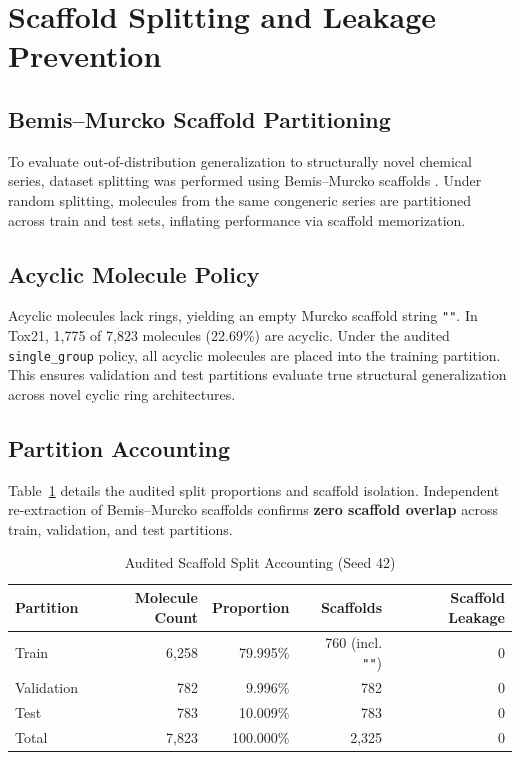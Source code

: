 \documentclass[conference]{IEEEtran}
\begin{document}
\section{Scaffold Splitting and Leakage Prevention}

\subsection{Bemis--Murcko Scaffold Partitioning}
To evaluate out-of-distribution generalization to structurally novel chemical series, dataset splitting was performed using Bemis--Murcko scaffolds \cite{bemis_murcko}.
Under random splitting, molecules from the same congeneric series are partitioned across train and test sets, inflating performance via scaffold memorization.

\subsection{Acyclic Molecule Policy}
Acyclic molecules lack rings, yielding an empty Murcko scaffold string \texttt{""}. In Tox21, 1,775 of 7,823 molecules (22.69\%) are acyclic.
Under the audited \texttt{single\_group} policy, all acyclic molecules are placed into the training partition. This ensures validation and test partitions evaluate true structural generalization across novel cyclic ring architectures.

\subsection{Partition Accounting}
Table~\ref{tab:splits} details the audited split proportions and scaffold isolation. Independent re-extraction of Bemis--Murcko scaffolds confirms \textbf{zero scaffold overlap} across train, validation, and test partitions.

\begin{table}[htbp]
\caption{Audited Scaffold Split Accounting (Seed 42)}
\begin{center}
\begin{tabular}{lrrrr}
\toprule
\textbf{Partition} & \textbf{Molecule Count} & \textbf{Proportion} & \textbf{Scaffolds} & \textbf{Scaffold Leakage} \\
\midrule
Train & 6,258 & 79.995\% & 760 (incl. \texttt{""}) & 0 \\
Validation & 782 & 9.996\% & 782 & 0 \\
Test & 783 & 10.009\% & 783 & 0 \\
\midrule
Total & 7,823 & 100.000\% & 2,325 & 0 \\
\bottomrule
\end{tabular}
\label{tab:splits}
\end{center}
\end{table}
\end{document}
